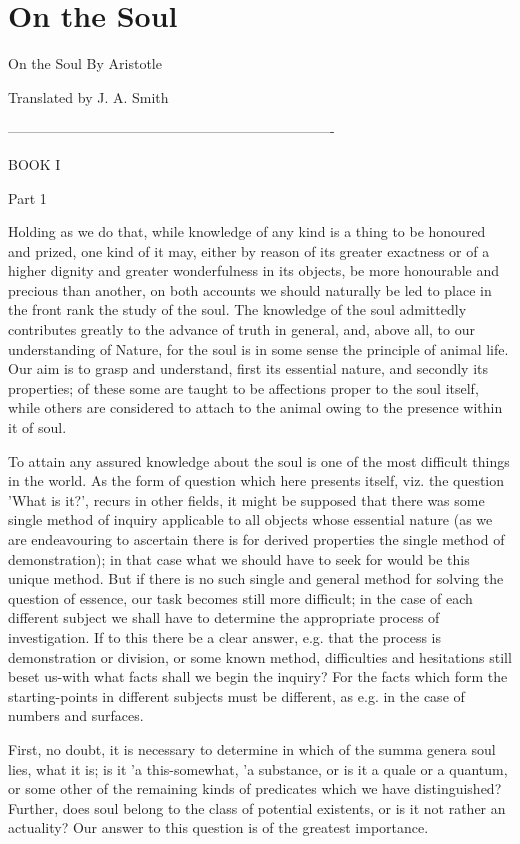 \chapter{On the Soul} %
\label{cha:soul}


On the Soul
By Aristotle


Translated by J. A. Smith

----------------------------------------------------------------------

BOOK I

Part 1 

Holding as we do that, while knowledge of any kind is a thing to
be honoured and prized, one kind of it may, either by reason of its
greater exactness or of a higher dignity and greater wonderfulness
in its objects, be more honourable and precious than another, on both
accounts we should naturally be led to place in the front rank the
study of the soul. The knowledge of the soul admittedly contributes
greatly to the advance of truth in general, and, above all, to our
understanding of Nature, for the soul is in some sense the principle
of animal life. Our aim is to grasp and understand, first its essential
nature, and secondly its properties; of these some are taught to be
affections proper to the soul itself, while others are considered
to attach to the animal owing to the presence within it of soul.

To attain any assured knowledge about the soul is one of the most
difficult things in the world. As the form of question which here
presents itself, viz. the question 'What is it?', recurs in other
fields, it might be supposed that there was some single method of
inquiry applicable to all objects whose essential nature (as we are
endeavouring to ascertain there is for derived properties the single
method of demonstration); in that case what we should have to seek
for would be this unique method. But if there is no such single and
general method for solving the question of essence, our task becomes
still more difficult; in the case of each different subject we shall
have to determine the appropriate process of investigation. If to
this there be a clear answer, e.g. that the process is demonstration
or division, or some known method, difficulties and hesitations still
beset us-with what facts shall we begin the inquiry? For the facts
which form the starting-points in different subjects must be different,
as e.g. in the case of numbers and surfaces. 

First, no doubt, it is necessary to determine in which of the summa
genera soul lies, what it is; is it 'a this-somewhat, 'a substance,
or is it a quale or a quantum, or some other of the remaining kinds
of predicates which we have distinguished? Further, does soul belong
to the class of potential existents, or is it not rather an actuality?
Our answer to this question is of the greatest importance.


